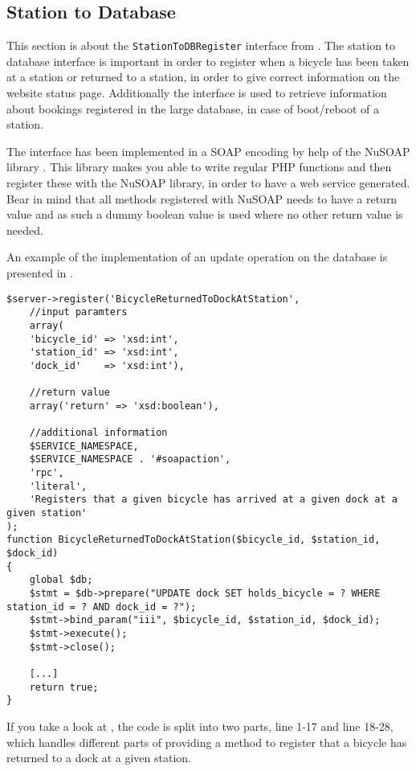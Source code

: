 \subsection{Station to Database}\label{sec:stationToWebI}
This section is about the \texttt{StationToDBRegister} interface from .
The station to database interface is important in order to register when a bicycle has been taken at a station or returned to a station, in order to give correct information on the website status page.
Additionally the interface is used to retrieve information about bookings registered in the large database, in case of boot/reboot of a station.

The interface has been implemented in a SOAP encoding by help of the NuSOAP library \citep{misc:nusoap}.
This library makes you able to write regular PHP functions and then register these with the NuSOAP library, in order to have a web service generated.
Bear in mind that all methods registered with NuSOAP needs to have a return value and as such a dummy boolean value is used where no other return value is needed.

An example of the implementation of an update operation on the database is presented in .

\begin{minipage}{\textwidth}
\begin{lstlisting}[caption = {Method for registering a bicycle has been returned to a dock at a given station.}, label = {lst:bicycledockstationreturned}]
$server->register('BicycleReturnedToDockAtStation',
	//input paramters
	array(	
	'bicycle_id' => 'xsd:int', 
	'station_id' => 'xsd:int',
	'dock_id'    => 'xsd:int'),
	
	//return value
 	array('return' => 'xsd:boolean'),
 	
 	//additional information
	$SERVICE_NAMESPACE,
	$SERVICE_NAMESPACE . '#soapaction',
	'rpc',
	'literal',
	'Registers that a given bicycle has arrived at a given dock at a given station'
);
function BicycleReturnedToDockAtStation($bicycle_id, $station_id, $dock_id)
{
	global $db;
	$stmt = $db->prepare("UPDATE dock SET holds_bicycle = ? WHERE station_id = ? AND dock_id = ?");
	$stmt->bind_param("iii", $bicycle_id, $station_id, $dock_id);
	$stmt->execute();
	$stmt->close();
	
	[...]
	return true;
}
\end{lstlisting}
\end{minipage}

If you take a look at , the code is split into two parts, line 1-17 and line 18-28, which handles different parts of providing a method to register that a bicycle has returned to a dock at a given station.

